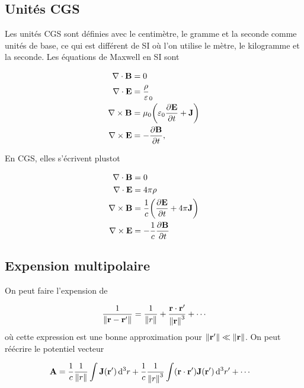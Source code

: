 \subsection{Unités CGS} %
\label{sub:Unités CGS}
Les unités CGS sont définies avec le centimètre, le gramme et la seconde comme
unités de base, ce qui est différent de SI où l'on utilise le mètre, le kilogramme
et la seconde. Les équations de Maxwell en SI sont

\begin{align}
    \nabla\cdot\vb{B}&=0\\
    \nabla\cdot\vb{E}&=\frac\rho{\varepsilon}_0\\
    \nabla\times\vb{B}&=\mu_0\qty(\varepsilon_0\pdv{\vb{E}}{t}+\vb{J})\\
    \nabla\times\vb{E}&=-\pdv{\vb{B}}{t},
\end{align}

En CGS, elles s'écrivent plustot

\begin{align}
    \nabla\cdot\vb{B}&=0\\
    \nabla\cdot\vb{E}&=4\pi\rho\\
    \nabla\times\vb{B}&=\frac1c\qty(\pdv{\vb{E}}{t}+4\pi\vb{J})\\
    \nabla\times\vb{E}&=-\frac1c\pdv{\vb{B}}{t}
\end{align}


\subsection{Expension multipolaire} %
\label{sub:Expension multipolaire}

On peut faire l'expension de

\begin{align}
    \frac1{\norm{\vb{r}-\vb{r'}}}=\frac1{\norm{r}}+\frac{\vb{r}\cdot\vb{r'}}{\norm{\vb{r}}^3}+\cdots
\end{align}
où cette expression est une bonne approximation pour $\norm{\vb{r'}}\ll\norm{\vb{r}}$.
On peut réécrire le potentiel vecteur

\begin{align}
    \vb{A}&=\frac1c\frac1{\norm{r}}\int\vb{J}(\vb{r'})\dd[3]{r}
    +\frac1c\frac1{\norm{r}^3}\int(\vb{r}\cdot\vb{r'})\vb{J}(\vb{r'})\dd[3]{r'}
    +\cdots
\end{align}

